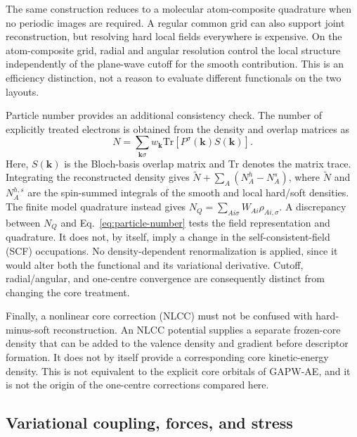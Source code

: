 \documentclass[10pt,a4paper,twocolumn]{article}
\begin{document}
The same construction reduces to a molecular atom-composite quadrature when no periodic images are required. A regular common grid can also support joint reconstruction, but resolving hard local fields everywhere is expensive. On the atom-composite grid, radial and angular resolution control the local structure independently of the plane-wave cutoff for the smooth contribution. This is an efficiency distinction, not a reason to evaluate different functionals on the two layouts.

Particle number provides an additional consistency check. The number of explicitly treated electrons is obtained from the density and overlap matrices as
\begin{equation}
 N=\sum_{\mathbf k\sigma}w_{\mathbf k}
           \mathrm{Tr}[P^\sigma(\mathbf k)S(\mathbf k)].
 \label{eq:particle-number}
\end{equation}
Here, $S(\mathbf k)$ is the Bloch-basis overlap matrix and $\mathrm{Tr}$ denotes the matrix trace. Integrating the reconstructed density gives $\widetilde N+\sum_A(N_A^h-N_A^s)$, where $\widetilde N$ and $N_A^{h,s}$ are the spin-summed integrals of the smooth and local hard/soft densities. The finite model quadrature instead gives $N_Q=\sum_{Ai\sigma}W_{Ai}\rho_{Ai,\sigma}$. A discrepancy between $N_Q$ and Eq.~\eqref{eq:particle-number} tests the field representation and quadrature. It does not, by itself, imply a change in the self-consistent-field (SCF) occupations. No density-dependent renormalization is applied, since it would alter both the functional and its variational derivative. Cutoff, radial/angular, and one-centre convergence are consequently distinct from changing the core treatment.

Finally, a nonlinear core correction (NLCC) must not be confused with hard-minus-soft reconstruction. An NLCC potential supplies a separate frozen-core density that can be added to the valence density and gradient before descriptor formation.\cite{Louie1982NLCC,Willand2013NLCC} It does not by itself provide a corresponding core kinetic-energy density. This is not equivalent to the explicit core orbitals of GAPW-AE, and it is not the origin of the one-centre corrections compared here.

\subsection{Variational coupling, forces, and stress}
\label{sec:variational}
\end{document}
